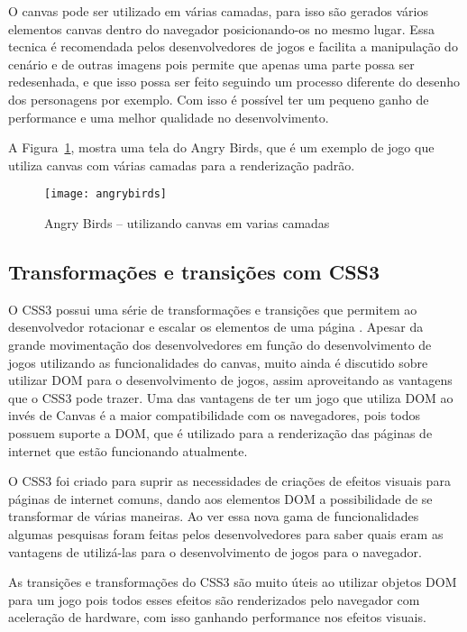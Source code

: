 O canvas pode ser utilizado em várias camadas, para isso são gerados
vários elementos canvas dentro do navegador posicionando-os no mesmo
lugar. Essa tecnica é recomendada pelos desenvolvedores de jogos e
facilita a manipulação do cenário e de outras imagens pois permite que
apenas uma parte possa ser redesenhada, e que isso possa ser feito
seguindo um processo diferente do desenho dos personagens por exemplo.
Com isso é possível ter um pequeno ganho de performance e uma melhor
qualidade no desenvolvimento.

A Figura~\ref{img:angrybirds}, mostra uma tela do Angry Birds, que é um exemplo de jogo
que utiliza canvas com várias camadas para a renderização padrão.

\newlength{\imgwidth}
\setlength{\imgwidth}{16.09cm}
\newlength{\imgheight}
\setlength{\imgheight}{10.59cm}

\begin{figure}[H]
  \centering
	\texttt{[image: angrybirds]}
  \caption{Angry Birds {--} utilizando canvas em varias camadas}
  \label{img:angrybirds}
\end{figure}


\subsection{Transformações e transições com CSS3}

O CSS3 possui uma série de transformações e transições que permitem ao
desenvolvedor rotacionar e escalar os elementos de uma página
\cite{agi2011html5}. Apesar da grande movimentação dos desenvolvedores
em função do desenvolvimento de jogos utilizando as funcionalidades do
canvas, muito ainda é discutido sobre utilizar DOM para o
desenvolvimento de jogos, assim aproveitando as vantagens que o CSS3
pode trazer.
Uma das vantagens de ter um jogo que utiliza DOM ao invés de Canvas é
a maior compatibilidade com os navegadores, pois todos possuem suporte
a DOM, que é utilizado para a renderização das páginas de internet que
estão funcionando atualmente.

O CSS3 foi criado para suprir as necessidades de criações de efeitos
visuais para páginas de internet comuns, dando aos elementos DOM a
possibilidade de se transformar de várias maneiras. Ao ver essa nova
gama de funcionalidades algumas pesquisas foram feitas pelos
desenvolvedores para saber quais eram as vantagens de utilizá-las para
o desenvolvimento de jogos para o navegador.

As transições e transformações do CSS3 são muito úteis ao utilizar
objetos DOM para um jogo pois todos esses efeitos são renderizados
pelo navegador com aceleração de hardware, com isso ganhando
performance nos efeitos visuais.

